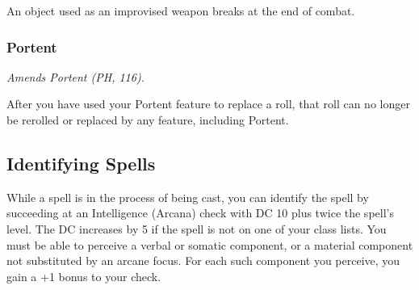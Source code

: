 \documentclass[letterpaper,twocolumn,openany,nodeprecatedcode]{dndbook}
\begin{document}
An object used as an improvised weapon breaks at the end of combat.


\subsubsection{Portent}
\textit{Amends Portent (PH, 116).}

After you have used your Portent feature to replace a roll, that roll can no longer be rerolled or replaced by any feature, including Portent.


\subsection{Identifying Spells}
While a spell is in the process of being cast, you can identify the spell by succeeding at an Intelligence (Arcana) check with DC 10 plus twice the spell's level. The DC increases by 5 if the spell is not on one of your class lists. You must be able to perceive a verbal or somatic component, or a material component not substituted by an arcane focus. For each such component you perceive, you gain a +1 bonus to your check.
\end{document}
